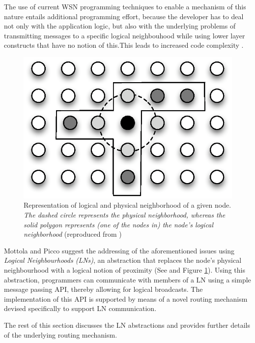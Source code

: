The use of current WSN
programming techniques to enable a mechanism of this nature entails additional
programming effort, because the developer has to deal not only with
the application logic, but also with the underlying problems of transmitting messages to a specific logical neighbouhood while using lower layer constructs that have no notion of this.This leads to
increased code complexity \cite{mottola_LN:2006}.

\begin{figure} 
\centering
\includegraphics[scale=0.71]{img/LN_physical_vs_logical.eps} 
\caption[Difference between physical and logical neighborhoods]{Representation 
of logical and physical neighborhood of a given node. \emph{The dashed circle 
represents the physical neighborhood, whereas the solid polygon represents (one 
of the nodes in) the node's logical neighborhood} (reproduced from
\cite{mottola_LN:2006})}
\label{Fig:LN_physical_vs_logical}
\end{figure} 

Mottola and Picco \cite{mottola_LN:2006} suggest the addressing of the
aforementioned issues using \emph{Logical Neighbourhoods (LNs)}, an
abstraction that replaces the node's physical neighbourhood with a logical notion of
proximity (See and Figure \ref{Fig:LN_physical_vs_logical}). Using this abstraction, programmers
can communicate
with members of a LN using a simple message passing API,
thereby allowing for logical broadcasts. The implementation of this API is
supported by means of a novel routing mechanism devised specifically to support
LN communication.


The rest of this section discusses the LN abstractions and provides further
details of the underlying routing mechanism.

